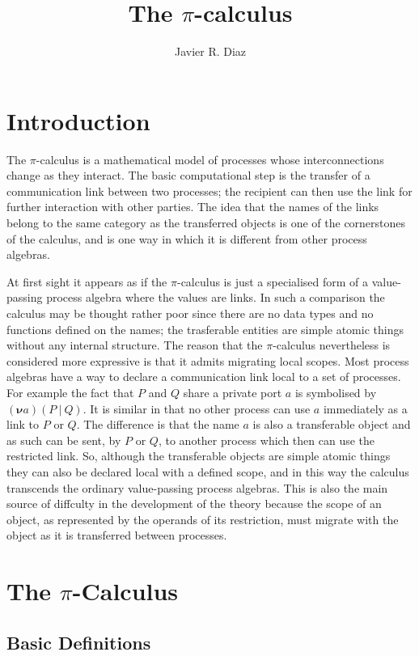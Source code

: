 \documentclass[10pt,a4paper]{article}
\author{Javier R. Diaz}
\title{The $\pi$-calculus}
\newcommand{\resp}[1]{(\boldsymbol{\nu}#1)}
\newcommand{\res}[2]{\resp{#1}#2}
\newcommand{\para}{\:|\:}
\begin{document}
\maketitle

\section{Introduction}

The $\pi$-calculus is a mathematical model of processes whose interconnections change as they interact. The basic computational step is the transfer of a communication link between two processes; the recipient can then use the link for further interaction with other parties. The idea that the names of the links belong to the same category as the transferred objects is one of the cornerstones of the calculus, and is one way in which it is different from other process algebras. 

At first sight it appears as if the $\pi$-calculus is just a specialised form of a value-passing process algebra where the values are links. In such a comparison the calculus may be thought rather poor since there are no data types and no functions defined on the names; the trasferable entities are simple atomic things without any internal structure. The reason that the $\pi$-calculus nevertheless is considered more expressive is that it admits migrating local scopes. Most process algebras have a way to declare a communication link local to a set of processes. For example the fact that $P$ and $Q$ share a private port $a$ is symbolised by $\res{a}{(P \para Q)}$. It is similar in that no other process can use $a$ immediately as a link to $P$ or $Q$. The difference is that the name $a$ is also a transferable object and as such can be sent, by $P$ or $Q$, to another process which then can use the restricted link. So, although the transferable objects are simple atomic things they can also be declared local with a defined scope, and in this way the calculus transcends the ordinary value-passing process algebras. This is also the main source of diffculty in the development of the theory because the scope of an object, as represented by the operands of its restriction, must migrate with the object as it is transferred between processes.

\section{The $\pi$-Calculus}

\subsection{Basic Definitions}
\end{document}
